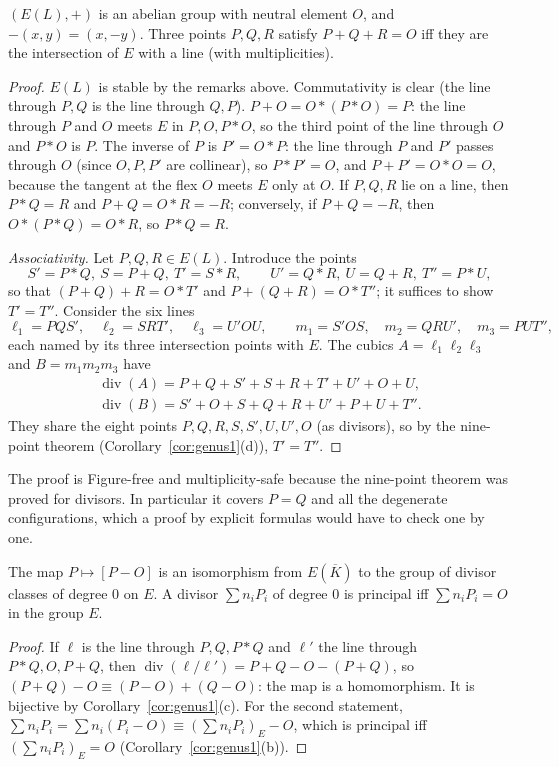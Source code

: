 \begin{theorem}\label{thm:grouplaw}
$(E(L),+)$ is an abelian group with neutral element $O$, and $-(x,y)=(x,-y)$. Three points $P,Q,R$ satisfy $P+Q+R=O$ iff they are the intersection of
$E$ with a line (with multiplicities).
\end{theorem}
\begin{proof}
$E(L)$ is stable by the remarks above. Commutativity is clear (the line through $P,Q$ is the line through $Q,P$). $P+O=O*(P*O)=P$: the line through $P$ and
$O$ meets $E$ in $P,O,P*O$, so the third point of the line through $O$ and $P*O$ is $P$. The inverse of $P$ is $P'=O*P$: the line through $P$ and $P'$
passes through $O$ (since $O,P,P'$ are collinear), so $P*P'=O$, and $P+P'=O*O=O$, because the tangent at the flex $O$ meets $E$ only at $O$. If
$P,Q,R$ lie on a line, then $P*Q=R$ and $P+Q=O*R=-R$; conversely, if $P+Q=-R$, then $O*(P*Q)=O*R$, so $P*Q=R$.

\emph{Associativity.} Let $P,Q,R\in E(L)$. Introduce the points
\[
S'=P*Q,\ S=P+Q,\ T'=S*R,\qquad U'=Q*R,\ U=Q+R,\ T''=P*U,
\]
so that $(P+Q)+R=O*T'$ and $P+(Q+R)=O*T''$; it suffices to show $T'=T''$. Consider the six lines
\[
\ell_1=PQS',\quad\ell_2=SRT',\quad\ell_3=U'OU,\qquad m_1=S'OS,\quad m_2=QRU',\quad m_3=PUT'',
\]
each named by its three intersection points with $E$. The cubics $A=\ell_1\ell_2\ell_3$ and $B=m_1m_2m_3$ have
\[
\begin{gathered}
\operatorname{div}(A)=P+Q+S'+S+R+T'+U'+O+U,\\
\operatorname{div}(B)=S'+O+S+Q+R+U'+P+U+T''.
\end{gathered}
\]
They share the eight points $P,Q,R,S,S',U,U',O$ (as divisors), so by the nine-point theorem (Corollary~\ref{cor:genus1}(d)), $T'=T''$.
\end{proof}

The proof is Figure-free and multiplicity-safe because the nine-point theorem was proved for divisors. In particular it covers $P=Q$ and all the
degenerate configurations, which a proof by explicit formulas would have to check one by one.

\begin{corollary}\label{cor:pic}
The map $P\mapsto[P-O]$ is an isomorphism from $E(\overline K)$ to the group of divisor classes of degree $0$ on $E$. A divisor $\sum n_iP_i$ of degree $0$ is
principal iff $\sum n_iP_i=O$ in the group $E$.
\end{corollary}
\begin{proof}
If $\ell$ is the line through $P,Q,P*Q$ and $\ell'$ the line through $P*Q,O,P+Q$, then
$\operatorname{div}(\ell/\ell')=P+Q-O-(P+Q)$, so $(P+Q)-O\equiv(P-O)+(Q-O)$: the map is a homomorphism. It is bijective by Corollary~\ref{cor:genus1}(c).
For the second statement, $\sum n_iP_i=\sum n_i(P_i-O)\equiv(\sum n_iP_i)_E-O$, which is principal iff $(\sum n_iP_i)_E=O$ (Corollary~\ref{cor:genus1}(b)).
\end{proof}

